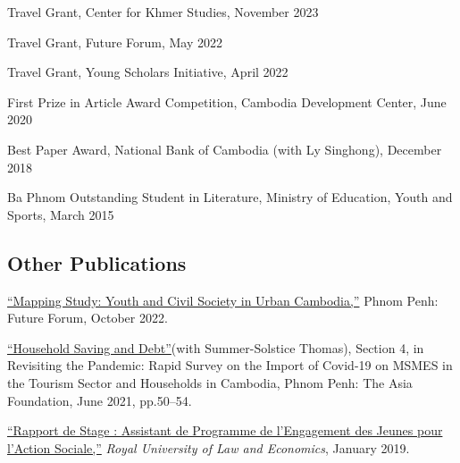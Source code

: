 \documentclass[10pt,a4paper]{article}
\begin{document}
\parindent=0pt
	
	Travel Grant, Center for Khmer Studies, November 2023 %
	
	Travel Grant, Future Forum, May 2022 %
	
	Travel Grant, Young Scholars Initiative, April 2022  %
	
	First Prize in Article Award Competition, Cambodia Development Center, June 2020 %
	
	Best Paper Award, National Bank of Cambodia (with Ly Singhong), December 2018 %
	
	Ba Phnom Outstanding Student in Literature, Ministry of Education, Youth and Sports, March 2015
	




\subsection*{Other Publications}



	\href{}{``Mapping Study: Youth and Civil Society in Urban Cambodia,”} Phnom Penh: Future Forum, October 2022.\\ \vspace{-.5em} 
	
	\href{https://kosalnith.github.io/research/policies/COVID-19-HHSavingsDebt.pdf}{``Household Saving and Debt”}(with Summer-Solstice Thomas), Section 4, in Revisiting the Pandemic: Rapid Survey on the Import of Covid-19 on MSMES in the Tourism Sector and Households in Cambodia, Phnom Penh: The Asia Foundation, June 2021, pp.50--54.\\ \vspace{-.5em} 
			
	\href{https://www.researchgate.net/publication/330936932_Rapport_du_Stage_Assistant_de_Programme_a_l%27YRDP}{``Rapport de Stage : Assistant de Programme de l'Engagement des Jeunes pour l'Action Sociale,”} \textit{Royal University of Law and Economics}, January 2019. \\ \vspace{-.5em}
			
\end{document}

